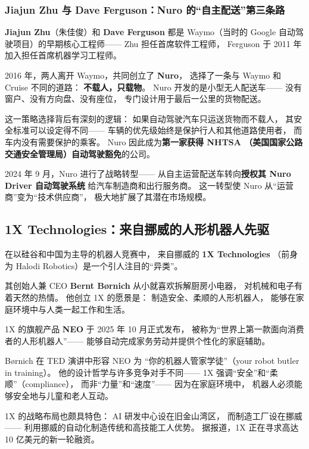 \subsubsection{Jiajun Zhu 与 Dave Ferguson：Nuro 的``自主配送''第三条路}

\textbf{Jiajun Zhu}（朱佳俊）和 \textbf{Dave Ferguson}
都是 Waymo（当时的 Google 自动驾驶项目）的早期核心工程师——
Zhu 担任首席软件工程师，
Ferguson 于 2011 年加入担任首席机器学习工程师。

2016 年，两人离开 Waymo，共同创立了 \textbf{Nuro}，
选择了一条与 Waymo 和 Cruise 不同的道路：
\textbf{不载人，只载物}。
Nuro 开发的是小型无人配送车——
没有窗户、没有方向盘、没有座位，
专门设计用于最后一公里的货物配送。

这一策略选择背后有深刻的逻辑：
如果自动驾驶汽车只运送货物而不载人，
其安全标准可以设定得不同——
车辆的优先级始终是保护行人和其他道路使用者，
而车内没有需要保护的乘客。
Nuro 因此成为\textbf{第一家获得 NHTSA
（美国国家公路交通安全管理局）自动驾驶豁免}的公司。

2024 年 9 月，Nuro 进行了战略转型——
从自主运营配送车转向\textbf{授权其 Nuro Driver 自动驾驶系统}
给汽车制造商和出行服务商。
这一转型使 Nuro 从``运营商''变为``技术供应商''，
极大地扩展了其潜在市场规模。


\subsection{1X Technologies：来自挪威的人形机器人先驱}
\label{subsec:1x-technologies}

在以硅谷和中国为主导的机器人竞赛中，
来自挪威的 \textbf{1X Technologies}
（前身为 Halodi Robotics）是一个引人注目的``异类''。

其创始人兼 CEO \textbf{Bernt Børnich} 从小就喜欢拆解厨房小电器，
对机械和电子有着天然的热情。
他创立 1X 的愿景是：
制造安全、柔顺的人形机器人，
能够在家庭环境中与人类一起工作和生活。

1X 的旗舰产品 \textbf{NEO} 于 2025 年 10 月正式发布，
被称为``世界上第一款面向消费者的人形机器人''——
能够自动完成家务劳动并提供个性化的家庭辅助。

Børnich 在 TED 演讲中形容 NEO 为
``你的机器人管家学徒''（your robot butler in training）。
他的设计哲学与许多竞争对手不同——
1X 强调``安全''和``柔顺''（compliance），
而非``力量''和``速度''——
因为在家庭环境中，
机器人必须能够安全地与儿童和老人互动。

1X 的战略布局也颇具特色：
AI 研发中心设在旧金山湾区，
而制造工厂设在挪威——
利用挪威的自动化制造传统和高技能工人优势。
据报道，1X 正在寻求高达 10 亿美元的新一轮融资。


